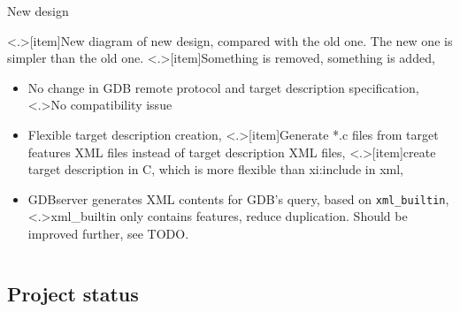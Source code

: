{\begin{columns}
    \begin{block}{New design}
      {
        \only<+->{}
        \note<.>[item]{New diagram of new design, compared with the old one.  The new one is simpler than the old one.}
        \note<.>[item]{Something is removed, something is added,}
        \small
        \begin{itemize}
        \item<+-> No change in GDB remote protocol and target description specification,
          \note<.>{No compatibility issue}
        \item<+-> Flexible target description creation,
          \note<.>[item]{Generate *.c files from target features XML files instead of target description XML files,}
          \note<.>[item]{create target description in C, which is more flexible than xi:include in xml,}
        \item<+-> GDBserver generates XML contents for GDB's query, based on \texttt{xml\_builtin},
          \note<.>{xml\_builtin only contains features, reduce duplication.  Should be improved further, see TODO.}
        \end{itemize}
      }
    \end{block}
    \vspace*{-.5cm}
    
  \end{columns}
}

\subsection{Project status}

